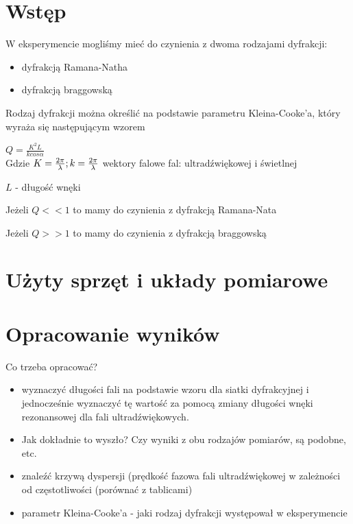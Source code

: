 \documentclass[a4paper,12pt]{article}
\begin{document}
\section{Wstęp}



W eksperymencie mogliśmy mieć do czynienia z dwoma rodzajami dyfrakcji:
\begin{itemize}
\item dyfrakcją Ramana-Natha
\item dyfrakcją braggowską
\end{itemize}

Rodzaj dyfrakcji można określić na podstawie parametru Kleina-Cooke'a, który wyraża się następującym wzorem

\(
Q = \frac{K^2  L}{k cos \alpha }
\)
\\
Gdzie
\(
K = \frac{2 \pi}{ \lambda }; \\ k = \frac{2 \pi}{\lambda}
\) wektory falowe fal: ultradźwiękowej i świetlnej

\( L  \) - długość wnęki

Jeżeli \( Q << 1\) to mamy do czynienia z dyfrakcją Ramana-Nata

Jeżeli \( Q >> 1 \) to mamy do czynienia z dyfrakcją braggowską

\section{Użyty sprzęt i układy pomiarowe}




\section{Opracowanie wyników}
Co trzeba opracować?
\begin{itemize}
\item wyznaczyć długości fali na podstawie wzoru dla siatki dyfrakcyjnej i jednocześnie wyznaczyć tę wartość za pomocą zmiany długości wnęki rezonansowej dla fali ultradźwiękowych.

\item Jak dokładnie to wyszło? Czy wyniki z obu rodzajów pomiarów, są podobne, etc.

\item znaleźć krzywą dyspersji (prędkość fazowa fali ultradźwiękowej w zależności od częstotliwości (porównać z tablicami)

\item parametr Kleina-Cooke'a - jaki rodzaj dyfrakcji występował w eksperymencie
\end{itemize}
\end{document}
